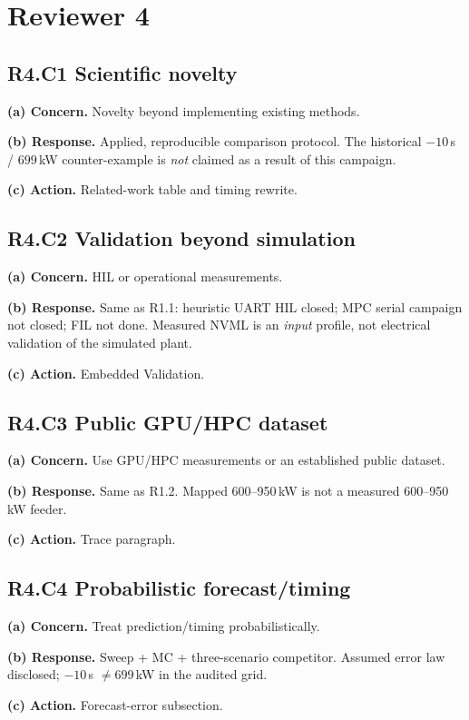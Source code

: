 \documentclass[11pt]{article}
\begin{document}
\section*{Reviewer 4}

\subsection*{R4.C1 Scientific novelty}
\textbf{(a) Concern.} Novelty beyond implementing existing methods.

\textbf{(b) Response.} Applied, reproducible comparison protocol. The historical $-10$\,s / $699$\,kW counter-example is \emph{not} claimed as a result of this campaign.

\textbf{(c) Action.} Related-work table and timing rewrite.

\subsection*{R4.C2 Validation beyond simulation}
\textbf{(a) Concern.} HIL or operational measurements.

\textbf{(b) Response.} Same as R1.1: heuristic UART HIL closed; MPC serial campaign not closed; FIL not done. Measured NVML is an \emph{input} profile, not electrical validation of the simulated plant.

\textbf{(c) Action.} Embedded Validation.

\subsection*{R4.C3 Public GPU/HPC dataset}
\textbf{(a) Concern.} Use GPU/HPC measurements or an established public dataset.

\textbf{(b) Response.} Same as R1.2. Mapped 600--950\,kW is not a measured 600--950\,kW feeder.

\textbf{(c) Action.} Trace paragraph.

\subsection*{R4.C4 Probabilistic forecast/timing}
\textbf{(a) Concern.} Treat prediction/timing probabilistically.

\textbf{(b) Response.} Sweep + MC + three-scenario competitor. Assumed error law disclosed; $-10$\,s $\neq 699$\,kW in the audited grid.

\textbf{(c) Action.} Forecast-error subsection.
\end{document}
